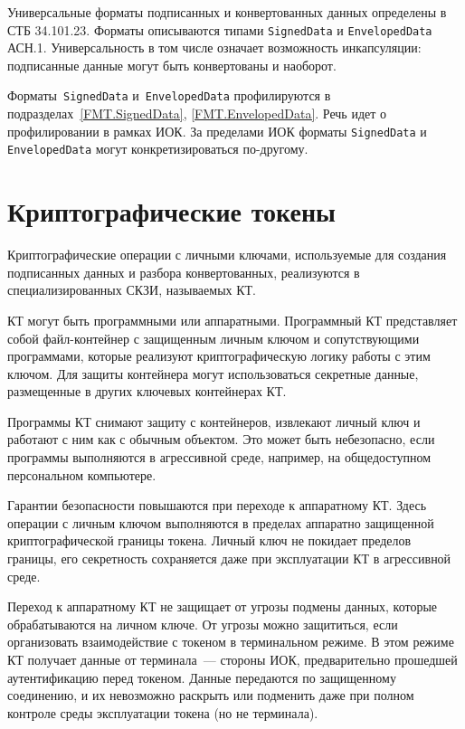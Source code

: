 Универсальные форматы подписанных и конвертованных данных определены в СТБ 34.101.23.
Форматы описываются типами  \texttt{SignedData} и \texttt{EnvelopedData} АСН.1. 
%
Универсальность в том числе означает возможность инкапсуляции:
подписанные данные могут быть конвертованы и наоборот.

Форматы~\texttt{SignedData} и~\texttt{EnvelopedData} профилируются в 
подразделах~\ref{FMT.SignedData}, \ref{FMT.EnvelopedData}. 
Речь идет о профилировании в рамках ИОК. За пределами ИОК форматы
\texttt{SignedData} и \texttt{EnvelopedData} могут конкретизироваться 
по-другому. 

\section{Криптографические токены}

Криптографические операции с личными ключами, используемые для создания 
подписанных данных и разбора конвертованных, реализуются в 
специализированных СКЗИ, называемых КТ.
                                        
КТ могут быть программными или аппаратными.
Программный КТ представляет собой файл-контейнер с защищенным личным 
ключом и сопутствующими программами, которые реализуют криптографическую 
логику работы с этим ключом. Для защиты контейнера могут использоваться 
секретные данные, размещенные в других ключевых контейнерах КТ.

Программы КТ снимают защиту с контейнеров, извлекают личный ключ и 
работают с ним как с обычным объектом. Это может быть небезопасно, если
программы выполняются в агрессивной среде, например, на общедоступном 
персональном компьютере. 

Гарантии безопасности повышаются при переходе к аппаратному КТ.
Здесь операции с личным ключом выполняются в пределах аппаратно защищенной 
криптографической границы токена. Личный ключ не покидает пределов границы,
его секретность сохраняется даже при эксплуатации КТ в агрессивной среде.

Переход к аппаратному КТ не защищает от угрозы подмены данных,
которые обрабатываются на личном ключе. От угрозы можно защититься,
если организовать взаимодействие с токеном в терминальном режиме.
В этом режиме КТ получает данные от терминала~--- стороны ИОК, 
предварительно прошедшей аутентификацию перед токеном. Данные передаются 
по защищенному соединению, и их невозможно раскрыть или подменить
даже при полном контроле среды эксплуатации токена (но не терминала).


